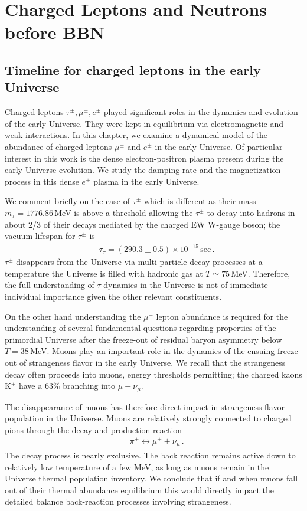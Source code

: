 \section{Charged Leptons and Neutrons before BBN} 
\subsection{Timeline for charged leptons in the early Universe}\label{Electron}
Charged leptons $\tau^\pm,\mu^\pm,e^\pm$ played significant roles in the dynamics and evolution of the early Universe. They were kept in equilibrium via electromagnetic and weak interactions.  In this chapter, we examine a dynamical model of the abundance of charged leptons $\mu^\pm$ and $e^\pm$ in the early Universe.  Of particular interest in this work is the dense electron-positron plasma present during the early Universe evolution. We study the damping rate and the magnetization process in this dense $e^\pm$ plasma in the early Universe.

We comment briefly on the case of $\tau^\pm$ which is different as their mass $m_\tau=1776.86$\,MeV is above a threshold allowing the $\tau^\pm$ to decay into hadrons in about 2/3 of their decays mediated by the charged EW  W-gauge boson; the vacuum lifespan for $\tau^\pm$ is~\cite{ParticleDataGroup:2022pth}
\begin{align}
&\tau_{\tau}=(290.3\pm0.5)\times10^{-15}\,\mathrm{sec}\,.
\end{align}
$\tau^\pm$ disappears from the Universe via multi-particle decay processes at a temperature the Universe is filled with hadronic gas at $T\simeq 75$\,MeV. Therefore, the full understanding of $\tau$ dynamics in the Universe is not of immediate individual importance given the other relevant constituents.

On the other hand understanding the $\mu^\pm$ lepton abundance is required for the understanding of several fundamental questions regarding properties of the primordial Universe after the freeze-out of residual baryon asymmetry below $T=38$\,MeV. Muons play an important role in the dynamics of the ensuing freeze-out of strangeness flavor in the early Universe. We recall that the strangeness decay often proceeds into muons, energy thresholds permitting;  the charged kaons K$^\pm$ have a 63\% branching into $\mu+\bar \nu_\mu$. 

The disappearance of muons has therefore direct impact in strangeness flavor population in the Universe. Muons are relatively strongly connected to charged pions through the decay and production reaction 
\begin{align}
&\pi^\pm\leftrightarrow \mu^\pm+\nu_\mu\,.
\end{align}
The decay process is nearly exclusive. The back reaction remains active down to relatively low temperature of a few MeV, as long as muons remain in the Universe thermal population inventory.  We conclude that if and when  muons fall out of their thermal abundance equilibrium this would directly impact the detailed balance back-reaction processes involving strangeness.  

